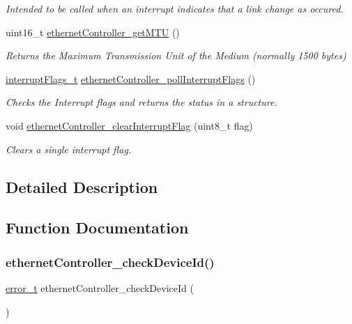 \begin{DoxyCompactItemize}
\begin{DoxyCompactList}\small\item\em Intended to be called when an interrupt indicates that a link change as occured. \end{DoxyCompactList}\item 
uint16\+\_\+t \mbox{\hyperlink{group__init_gabb37702e7cfbd10dc932ca6502fd7bae}{ethernet\+Controller\+\_\+get\+M\+TU}} ()
\begin{DoxyCompactList}\small\item\em Returns the Maximum Transmission Unit of the Medium (normally 1500 bytes) \end{DoxyCompactList}\item 
\mbox{\hyperlink{group__interrupts_ga337298055be267e726930c9fc6b2d4eb}{interrupt\+Flags\+\_\+t}} \mbox{\hyperlink{group__init_ga5cdd5a8c6a5ceab1292643f291137bd1}{ethernet\+Controller\+\_\+poll\+Interrupt\+Flags}} ()
\begin{DoxyCompactList}\small\item\em Checks the Interrupt flags and returns the status in a structure. \end{DoxyCompactList}\item 
void \mbox{\hyperlink{group__init_ga472d2ba5053ebbb349e514699adfcde3}{ethernet\+Controller\+\_\+clear\+Interrupt\+Flag}} (uint8\+\_\+t flag)
\begin{DoxyCompactList}\small\item\em Clears a single interrupt flag. \end{DoxyCompactList}\end{DoxyCompactItemize}


\subsection{Detailed Description}


\subsection{Function Documentation}
\mbox{\label{group__init_ga67521cdab8bfce49cee40d037a888793}} 
\subsubsection{\texorpdfstring{ethernetController\_checkDeviceId()}{ethernetController\_checkDeviceId()}}
{\footnotesize\ttfamily \mbox{\hyperlink{group__error_gad3ae44be85fe6952dcaed425499e8f6b}{error\+\_\+t}} ethernet\+Controller\+\_\+check\+Device\+Id (\begin{DoxyParamCaption}{ }\end{DoxyParamCaption})}



